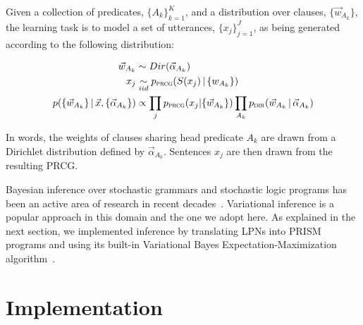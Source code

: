 \documentclass{article} %
\begin{document}
Given a collection of predicates, $\{A_k\}_{k=1}^{K}$, and a
distribution over clauses, $\{\vec{w}_{A_k}\}$, the learning task is
to model a set of utterances, $\{x_j\}_{j=1}^{J}$, as being generated
according to the following distribution:

\begin{align*}
  \vec{w}_{A_k} &\sim Dir(\vec{\alpha}_{A_k})\\
  x_j &\underset{iid}{\sim} p_{\text{\textsc{prcg}}}(S(x_j)\,|\,\{w_{A_k}\})\\
  p(\{\vec{w}_{A_k}\}\,|\, \vec{x}, \{\vec{\alpha}_{A_k}\}) &\propto
  \prod_j p_{\text{\textsc{prcg}}}(x_j|\{\vec{w}_{A_k}\}) \prod_{A_k}
  p_{\text{\textsc{dir}}}(\vec{w}_{A_k}\,|\,\vec{\alpha}_{A_k})
\end{align*}


In words, the weights of clauses sharing head predicate $A_k$ are
drawn from a Dirichlet distribution defined by
$\vec{\alpha}_{A_k}$. Sentences $x_j$ are then drawn from the
resulting PRCG.

Bayesian inference over stochastic grammars
and stochastic logic programs has been an active area of
research in recent decades~\cite{DBLP:journals/etai/Muggleton00, cussens2001parameter, DBLP:conf/emnlp/LiangPJK07,
  goldwater2006contextual, johnson2006adaptor}.
Variational inference is a popular approach in this domain and the one
we adopt here. As explained in the next section, we implemented
inference by translating LPNs into PRISM programs and using its
built-in Variational Bayes Expectation-Maximization
algorithm~\cite{sato2008variational}. 

\section{Implementation \label{sec:implementation}}
\end{document}
